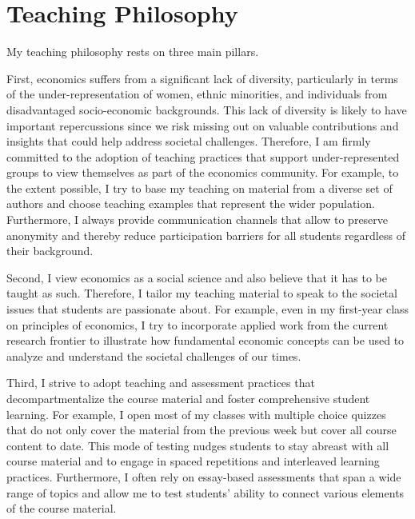 \documentclass[11pt, a4paper]{article}
\begin{document}
\section{Teaching Philosophy}
My teaching philosophy rests on three main pillars. 

First, economics suffers from a significant lack of diversity, particularly in terms of the under-representation of women, ethnic minorities, and individuals from disadvantaged socio-economic backgrounds. This lack of diversity is likely to have important repercussions since we risk missing out on valuable contributions and insights that could help address societal challenges. Therefore, I am firmly committed to the adoption of teaching practices that support under-represented groups to view themselves as part of the economics community. For example, to the extent possible, I try to base my teaching on material from a diverse set of authors and choose teaching examples that represent the wider population. Furthermore, I always provide communication channels that allow to preserve anonymity and thereby reduce participation barriers for all students regardless of their background.

Second, I view economics as a social science and also believe that it has to be taught as such. Therefore, I tailor my teaching material to speak to the societal issues that students are passionate about. For example, even in my first-year class on principles of economics, I try to incorporate applied work from the current research frontier to illustrate how fundamental economic concepts can be used to analyze and understand the societal challenges of our times.


Third, I strive to adopt teaching and assessment practices that decompartmentalize the course material and foster comprehensive student learning. For example, I open most of my classes with multiple choice quizzes that do not only cover the material from the previous week but cover all course content to date. This mode of testing nudges students to stay abreast with all course material and to engage in spaced repetitions and interleaved learning practices. Furthermore, I often rely on essay-based assessments that span a wide range of topics and allow me to test students' ability to connect various elements of the course material. 
\end{document}
